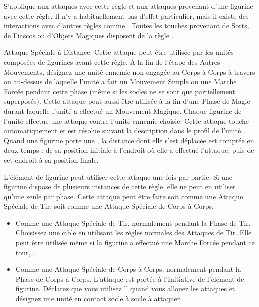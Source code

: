 S'applique aux attaques avec cette règle et aux attaques provenant d'une figurine avec cette règle. Il n'y a habituellement pas d'effet particulier, mais il existe des interactions avec d'autres règles comme \ethereal{}.  Toutes les touches provenant de Sorts, de Fiascos ou d'Objets Magiques disposent de la règle \magicalattacks{}.


Attaque Spéciale à Distance. Cette attaque peut être utilisée par les unités composées de figurines ayant cette règle. À la fin de l'étape des Autres Mouvements, désignez une unité ennemie non engagée au Corps à Corps à travers ou au-dessus de laquelle l'unité a fait un Mouvement Simple ou une Marche Forcée pendant cette phase (même si les socles ne se sont que partiellement superposés). Cette attaque peut aussi être utilisée à la fin d'une Phase de Magie durant laquelle l'unité a effectué un Mouvement Magique. Chaque figurine de l'unité effectue une attaque contre l'unité ennemie choisie. Cette attaque touche automatiquement et est résolue suivant la description dans le profil de l'unité. Quand une figurine porte une \sweepingattack{}, la distance dont elle s'est déplacée est comptée en deux temps : de sa position initiale à l'endroit où elle a effectué l'attaque, puis de cet endroit à sa position finale.


L'élément de figurine peut utiliser cette attaque une fois par partie. Si une figurine dispose de plusieurs instances de cette règle, elle ne peut en utiliser qu'une seule par phase. Cette attaque peut être faite soit comme une Attaque Spéciale de Tir, soit comme une Attaque Spéciale de Corps à Corps.
\begin{itemize}[label={\textbullet}]
\item Comme une Attaque Spéciale de Tir, normalement pendant la Phase de Tir. Choisissez une cible en utilisant les règles normales des Attaques de Tir.  Elle peut être utilisée même si la figurine a effectué une Marche Forcée pendant ce tour, .
\item Comme une Attaque Spéciale de Corps à Corps, normalement pendant la Phase de Corps à Corps. L'attaque est portée à l'Initiative de l'élément de figurine. Déclarez que vous utilisez l'\breathweapon{} quand vous allouez les attaques et désignez une unité en contact socle à socle à attaquer.
\end{itemize}

